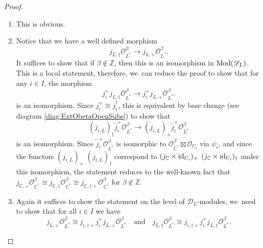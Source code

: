 \documentclass[JEP,XML,SOM,Unicode,published]{cedram}
\let\mathds\mathbb
\newcommand{\quand}{\quad\text{and}\quad}
\newcommand{\dC}{{\mathds C}}\let\C\dC
\newcommand{\dZ}{{\mathds Z}}\let\mbz\dZ\let\Z\dZ
\newcommand{\cD}{\mathscr{D}}
\newcommand{\cO}{\mathcal{O}}\let\O\cO
\DeclareMathOperator{\id}{\textup{id}}
\begin{document}
\skpt
\begin{proof}
\begin{enumerate}
\item
This is obvious.

\item
Notice that we have a well defined morphism
\[
j_{L,\dag} \cO_{L^*}^\beta \to j_{L,+} \cO_{L^*}^\beta.
\]
It suffices to show that if $\beta\notin\Z$, then this is an isomorphism in $\textup{Mod}(\cD_L)$. This is a local statement, therefore, we~can reduce the proof to show that for any $i\in I$, the morphism
\[
j_i^+j_{L,\dag} \cO_{L^*}^\beta \to j_i^+j_{L,+} \cO_{L^*}^\beta.
\]
is an isomorphism. Since $j_i^+\cong j_i^\dag$, this is equivalent by base change (see diagram \eqref{diag:ExtObetaOpenSubs}) to show that
\[
(j_{i,L})_\dag\tilde{j}_i^+ \cO_{L^*}^\beta \to
(j_{i,L})_+\tilde{j}_i^+ \cO_{L^*}^\beta
\]
is an isomorphism. Since $\tilde{j}_i^+ \cO_{L^*}^\beta$ is isomorphic to
$\cO^\beta_{\dC^*}\boxtimes \cO_{U_i}$ via $\psi_i$, and since the functors $(j_{i,L})_+$ \resp $(j_{i,L})_\dag$ correspond to $(j_\dC\times\id_{U_i})_+$ \resp $(j_\dC\times\id_{U_i})_\dag$ under this isomorphism, the statement reduces to the well-known fact that
$j_{\dC,+}\cO_{\dC^*}^\beta\cong j_{\dC,\dag}\cO_{\dC^*}^\beta\cong j_{\dC,\dag+}\cO^\beta_{\dC^*}$ for $\beta\notin\dZ$.
\item

Again it suffices to show the statement on the level of $\cD_L$\nobreakdash-mod\-ules, \ie we~need to show that for all $i\in I$ we have
\begin{equation}\label{eq:MinExt}
j_{L,+} \cO^\beta_{L^{*}} \cong j_{i,\dag+} j_i^+ j_{L,+} \cO^\beta_{L^{*}}
\quand
j_{L,\dag} \cO^\beta_{L^{*}} \cong
j_{i,\dag+} j_i^+ j_{L,\dag} \cO^\beta_{L^{*}}.
\end{equation}


\end{enumerate}
\end{proof}
\end{document}
